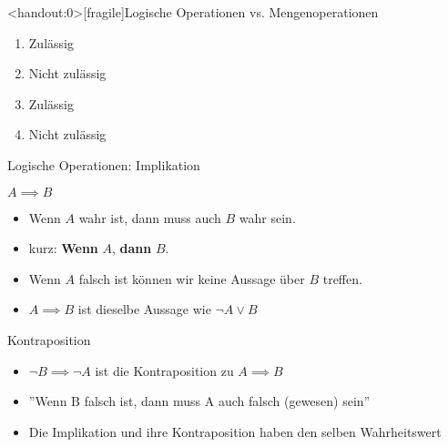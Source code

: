 {
	\begin{frame}<handout:0>[fragile]{Logische Operationen vs. Mengenoperationen}
		\begin{enumerate}[<+- | alert@+>]
			\item Zulässig
			\item Nicht zulässig
			\item Zulässig
			\item Nicht zulässig
		\end{enumerate}
	\end{frame}
}



\begin{frame}{Logische Operationen: Implikation}
\begin{alertblock}{$A\implies B$}
\begin{itemize}
    \item \glqq Wenn $A$ wahr ist, dann muss auch $B$ wahr sein.\grqq
    \item kurz: \glqq\textbf{Wenn} $A$, \textbf{dann} $B$.\grqq
    \item Wenn $A$ falsch ist können wir keine Aussage über $B$ treffen.
    \item $A\implies B$ ist dieselbe Aussage wie $\neg A \vee B$
\end{itemize}
\end{alertblock}
 {
\begin{exampleblock}{Kontraposition}
	\begin{itemize}
		\item $\lnot B\implies \lnot A$ ist die Kontraposition zu $A \implies B$
		\item ''Wenn B falsch ist, dann muss A auch falsch (gewesen) sein''
		\item Die Implikation und ihre Kontraposition haben den selben Wahrheitswert
	\end{itemize}
\end{exampleblock}
}
\end{frame}

